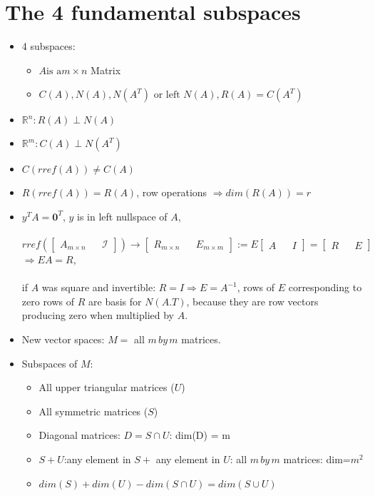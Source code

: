 \documentclass[a4paper,12pt]{article}
\begin{document}
\section{The 4 fundamental subspaces}
\begin{itemize}
	\item 4 subspaces:
	\begin{itemize}
		\item $A \text{is a} m \times n$ Matrix
		\item $C(A),N(A), N(A^T) \text{ or left } N(A), R(A) = C(A^T)$
	\end{itemize}
	\item $\mathbf{\mathbb{R}}^n: R(A) \perp N(A)$ 
	\item $\mathbf{\mathbb{R}}^m: C(A) \perp N(A^T)$
	\item $C(rref(A)) \neq C(A)$
	\item $R(rref(A)) = R(A)$, row operations $\Longrightarrow dim(R(A)) = r$
	\item $y^T A = \mathbf{0}^T $, $y$ is in left nullspace of $A$,\\
	\\
		$rref(\begin{bmatrix}
		A_{m \times n} & & \mathcal{I} 
		\end{bmatrix}) \longrightarrow    
		\begin{bmatrix}
R_{m \times n} & & E_{m \times m}
		\end{bmatrix}		
 := E
 \begin{bmatrix}
 A& & I
 \end{bmatrix}
  = \begin{bmatrix}
   R& & E
   \end{bmatrix}$ \\
   $ \Longrightarrow EA = R$, \\
   \\
		 if $A$ was square and invertible: $R = I \Rightarrow E = A^{-1}$, rows of $E$ corresponding to zero rows of $R$ are basis for $N(A.T)$, because they are row vectors producing zero when multiplied by $A$.
		 
		 \item New vector spaces: $M = $ all $m\,by\,m$ matrices.
		 \item Subspaces of $M$: 
		 \begin{itemize}
		 	\item All upper triangular matrices ($U$)
		 	\item All symmetric matrices ($S$)
		 	\item Diagonal matrices: $D = S \cap U$: dim(D) = m
		 	\item $S+U$:any element in $S +$ any element in $U$: all $m\,by\,m$ matrices: dim=$m^2$
			\item $dim(S)+dim(U) - dim(S \cap U) = dim(S \cup U)$		 	
		 \end{itemize}
\end{itemize}
\end{document}
